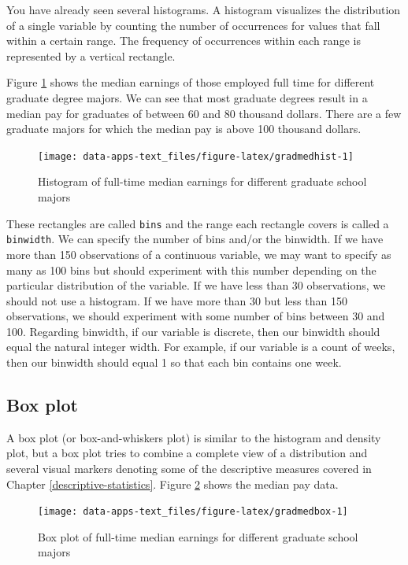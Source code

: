 \documentclass[
]{book}
\begin{document}
You have already seen several histograms. A histogram visualizes the distribution of a single variable by counting the number of occurrences for values that fall within a certain range. The frequency of occurrences within each range is represented by a vertical rectangle.

Figure \ref{fig:gradmedhist} shows the median earnings of those employed full time for different graduate degree majors. We can see that most graduate degrees result in a median pay for graduates of between 60 and 80 thousand dollars. There are a few graduate majors for which the median pay is above 100 thousand dollars.

\begin{figure}

{\centering \texttt{[image: data-apps-text\_files/figure-latex/gradmedhist-1]} 

}

\caption{Histogram of full-time median earnings for different graduate school majors}\label{fig:gradmedhist}
\end{figure}

These rectangles are called \texttt{bins} and the range each rectangle covers is called a \texttt{binwidth}. We can specify the number of bins and/or the binwidth. If we have more than 150 observations of a continuous variable, we may want to specify as many as 100 bins but should experiment with this number depending on the particular distribution of the variable. If we have less than 30 observations, we should not use a histogram. If we have more than 30 but less than 150 observations, we should experiment with some number of bins between 30 and 100. Regarding binwidth, if our variable is discrete, then our binwidth should equal the natural integer width. For example, if our variable is a count of weeks, then our binwidth should equal 1 so that each bin contains one week.

\hypertarget{box-plot}{%
\subsection{Box plot}\label{box-plot}}

A box plot (or box-and-whiskers plot) is similar to the histogram and density plot, but a box plot tries to combine a complete view of a distribution and several visual markers denoting some of the descriptive measures covered in Chapter \ref{descriptive-statistics}. Figure \ref{fig:gradmedbox} shows the median pay data.

\begin{figure}

{\centering \texttt{[image: data-apps-text\_files/figure-latex/gradmedbox-1]} 

}

\caption{Box plot of full-time median earnings for different graduate school majors}\label{fig:gradmedbox}
\end{figure}
\end{document}
